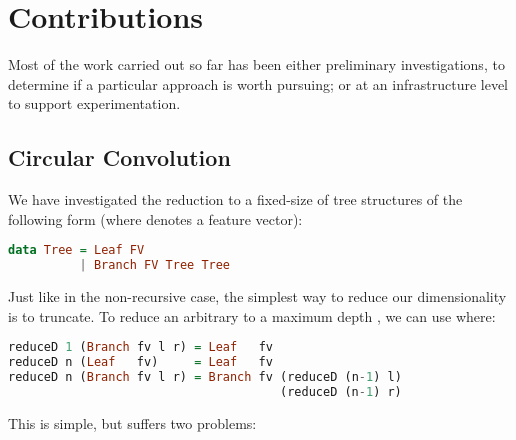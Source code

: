 \documentclass[]{article}
\begin{document}
\cite{Gartner2003}
\cite{Oveisi.Oveisi.Erfanian.ea:2012}
\cite{bakir2007predicting}
\cite{conf/ijcai/Plate91}
\cite{goller1996learning}
\cite{kwasny1995tail}
\cite{pollack1990recursive}
\cite{zanzotto2012distributed}

\iffalse

Machine learning over structured data:
1D is common: parsing natural language
2D is common; images
Trees are fractal
Backpropagation through structure
LSTM with recursive structure
Most work tries to identify structure; we already have it

Recurrent neural networks
Backpropagation through structure

\fi

\section{Contributions}\label{current}

Most of the work carried out so far has been either preliminary investigations, to determine if a particular approach is worth pursuing; or at an infrastructure level to support experimentation.

\subsection{Circular Convolution}\label{circularconvolution}

We have investigated the reduction to a fixed-size of tree structures of the following form (where  denotes a feature vector):

\begin{lstlisting}[language=Haskell, xleftmargin=.2\textwidth, xrightmargin=.2\textwidth]
data Tree = Leaf FV
          | Branch FV Tree Tree
\end{lstlisting}

Just like in the non-recursive case, the simplest way to reduce our dimensionality is to truncate. To reduce an arbitrary  to a maximum depth , we can use  where:

\begin{lstlisting}[language=Haskell, xleftmargin=.2\textwidth, xrightmargin=.2\textwidth]
reduceD 1 (Branch fv l r) = Leaf   fv
reduceD n (Leaf   fv)     = Leaf   fv
reduceD n (Branch fv l r) = Branch fv (reduceD (n-1) l)
                                      (reduceD (n-1) r)
\end{lstlisting}

This is simple, but suffers two problems:
\end{document}
